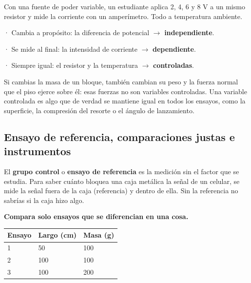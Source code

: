   
\begin{ejemplo} Con una fuente de poder variable, un estudiante aplica 2, 4, 6 y 8 V a un mismo resistor y mide la corriente con un amperímetro. Todo a temperatura ambiente.\par · Cambia a propósito: la diferencia de potencial \ensuremath{\rightarrow} \textbf{independiente}.\par · Se mide al final: la intensidad de corriente \ensuremath{\rightarrow} \textbf{dependiente}.\par · Siempre igual: el resistor y la temperatura \ensuremath{\rightarrow} \textbf{controladas}.\end{ejemplo}
 
\begin{clave}[{Recuerda}] Si cambias la masa de un bloque, también cambian su peso y la fuerza normal que el piso ejerce sobre él: esas fuerzas no son variables controladas. Una variable controlada es algo que de verdad se mantiene igual en todos los ensayos, como la superficie, la compresión del resorte o el ángulo de lanzamiento.\end{clave}
\subsection{Ensayo de referencia, comparaciones justas e instrumentos}
El \textbf{grupo control} o \textbf{ensayo de referencia} es la medición sin el factor que se estudia. Para saber cuánto bloquea una caja metálica la señal de un celular, se mide la señal fuera de la caja (referencia) y dentro de ella. Sin la referencia no sabrías si la caja hizo algo.

 

\textbf{Compara solo ensayos que se diferencian en una cosa.}

 
\begin{center}\small
\begin{tabular}{@{}lll@{}}
\toprule
\textbf{Ensayo} & \textbf{Largo (cm)} & \textbf{Masa (g)} \\
\midrule
1 & 50 & 100 \\
2 & 100 & 100 \\
3 & 100 & 200 \\
\bottomrule
\end{tabular}
\end{center}
 

